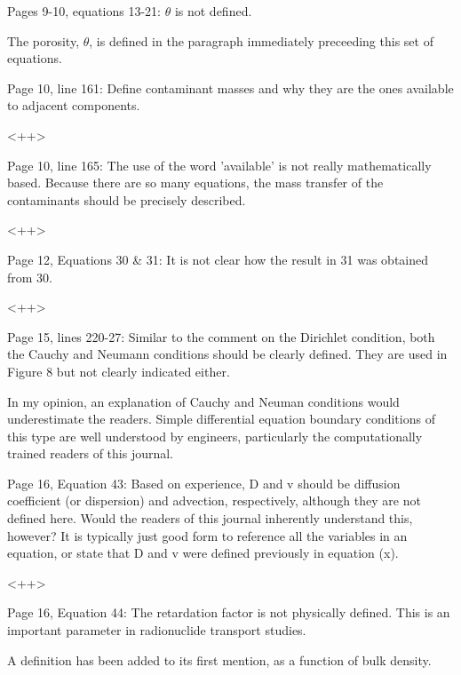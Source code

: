 \documentclass[answers,12pt]{exam}
\begin{document}
\begin{questions}
\question Pages 9-10, equations 13-21: $\theta$  is not defined.  
\begin{solution}
The porosity, $\theta$, is defined in the paragraph immediately preceeding this 
        set of equations.
\end{solution} 
 
\question Page  10,  line  161:  Define  contaminant  masses  and  why  they  are  the  ones  available  to  adjacent  components. 
\begin{solution}
<++>
\end{solution} 
 
\question Page  10,  line  165:  The  use  of the word 'available' is not really mathematically based. Because there are so 
many equations, the mass transfer of the contaminants should be precisely described.  
\begin{solution}
<++>
\end{solution} 
 
\question Page 12, Equations 30 \& 31: It is not clear how the result in 31 was obtained from 30.  
\begin{solution}
<++>
\end{solution} 
 
\question Page 15, lines 220-27: Similar to the comment on the Dirichlet condition, both the Cauchy and Neumann 
conditions should be clearly defined. They are used in Figure 8 but not clearly indicated either.  
\begin{solution}
In my opinion, an explanation of Cauchy and Neuman conditions would 
        underestimate the readers. Simple differential equation boundary 
        conditions of this type are well understood by engineers, 
        particularly the computationally trained readers of this journal.
\end{solution}
 
\question Page  16,  Equation  43:  Based  on  experience,  D  and  v  should  be  diffusion coefficient (or dispersion) and 
advection,  respectively,  although  they  are  not  defined  here.  Would  the  readers  of  this  journal inherently 
understand  this,  however?  It  is  typically  just  good  form  to  reference  all  the  variables  in  an  equation,  or 
state that D and v were defined previously in equation (x).  
\begin{solution}
        <++>
\end{solution} 
 
\question Page  16,  Equation  44:  The  retardation  factor  is  not physically defined. This is an important parameter in 
radionuclide transport studies.  
\begin{solution}
A definition has been added to its first mention, as a function of bulk 
        density.
\end{solution} 
 

\end{questions}
\end{document}
